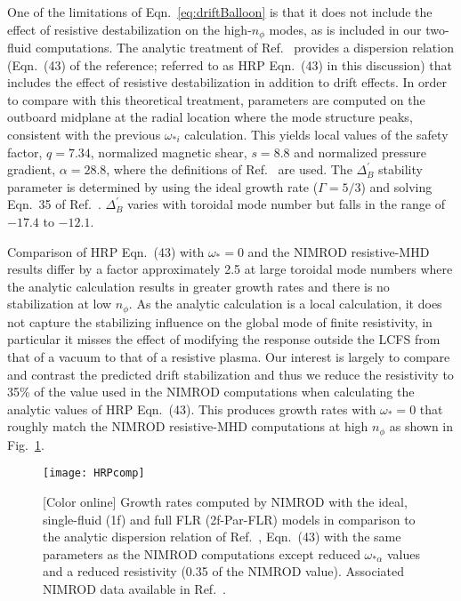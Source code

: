 One of the limitations of Eqn.~\eqref{eq:driftBalloon} is that it does not
include the effect of resistive destabilization on the high-$n_\phi$ modes,
as is included in our two-fluid computations.
The analytic treatment of Ref.~\cite{Hastie03} provides a dispersion relation
(Eqn.~(43) of the reference; referred to as HRP Eqn.~(43) in this discussion) that
includes the effect of resistive destabilization in addition to drift effects.
In order to compare with this theoretical treatment, parameters are computed
on the outboard midplane at the radial location where the mode structure peaks,
consistent with the previous $\omega_{*i}$ calculation. This yields local values
of the safety factor, $q=7.34$, normalized magnetic shear, $s=8.8$ and
normalized pressure gradient, $\alpha=28.8$, where the definitions of
Ref.~\cite{Hastie03} are used.  The $\Delta^\prime_B$ stability parameter is
determined by using the ideal growth rate ($\Gamma=5/3$) and solving Eqn.~35 of
Ref.~\cite{Hastie03}.  $\Delta^\prime_B$ varies with toroidal mode number but
falls in the range of $-17.4$ to $-12.1$. 

Comparison of HRP Eqn.~(43) with $\omega_*=0$ and the NIMROD resistive-MHD results
differ by a factor approximately 2.5 at large toroidal mode numbers where the
analytic calculation results in greater growth rates and there is no
stabilization at low $n_\phi$. As the analytic calculation is a local calculation, it
does not capture the stabilizing influence on the global mode of finite
resistivity, in particular it misses the effect of modifying the response outside the
LCFS from that of a vacuum to that of a resistive plasma.  Our interest is
largely to compare and contrast the predicted drift stabilization and thus we
reduce the resistivity to 35\% of the value used in the NIMROD computations
when calculating the analytic values of HRP Eqn.~(43). This produces growth
rates with $\omega_*=0$ that roughly match the NIMROD resistive-MHD
computations at high $n_\phi$ as shown in Fig.~\ref{HRPcomp}.

\begin{figure}
  \centering
  \texttt{[image: HRPcomp]}
  \vspace{-4mm}
  \caption{[Color online]
  Growth rates computed by NIMROD with the ideal, single-fluid (1f) and full
  FLR (2f-Par-FLR) models in comparison to the analytic dispersion relation of
  Ref.~\cite{Hastie03}, Eqn.~(43) with the same parameters as the NIMROD
  computations except reduced $\omega_{*\alpha}$ values and a reduced
  resistivity (0.35 of the NIMROD value).
  Associated NIMROD data available in Ref.~\cite{king16Z}.}
  \label{HRPcomp}
\end{figure}

